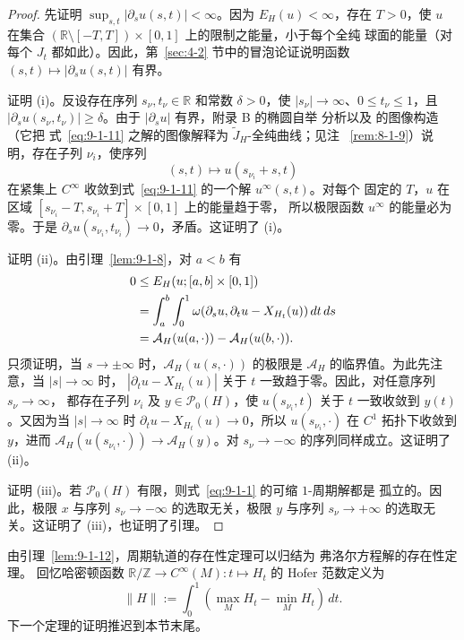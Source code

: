 \begin{proof}
先证明 $\sup_{s,t}|\partial_su(s,t)|<\infty$。因为 $E_H(u)<\infty$，存在 $T>0$，使
$u$ 在集合 $(\mathbb R\setminus[-T,T])\times[0,1]$ 上的限制之能量，小于每个全纯
球面的能量（对每个 $J_t$ 都如此）。因此，第~\ref{sec:4-2} 节中的冒泡论证说明函数
$(s,t)\mapsto|\partial_su(s,t)|$ 有界。

证明 (i)。反设存在序列 $s_\nu,t_\nu\in\mathbb R$ 和常数 $\delta>0$，使
$|s_\nu|\to\infty$、$0\le t_\nu\le1$，且
$|\partial_su(s_\nu,t_\nu)|\ge\delta$。由于 $|\partial_su|$ 有界，附录 B 的椭圆自举
分析以及 的图像构造（它把
式~\eqref{eq:9-1-11} 之解的图像解释为 $\widetilde J_H$-全纯曲线；见注
~\ref{rem:8-1-9}）说明，存在子列 $\nu_i$，使序列
\[
  (s,t)\longmapsto u(s_{\nu_i}+s,t)
\]
在紧集上 $C^\infty$ 收敛到式~\eqref{eq:9-1-11} 的一个解 $u^\infty(s,t)$。对每个
固定的 $T$，$u$ 在区域 $[s_{\nu_i}-T,s_{\nu_i}+T]\times[0,1]$ 上的能量趋于零，
所以极限函数 $u^\infty$ 的能量必为零。于是
$\partial_su(s_{\nu_i},t_{\nu_i})\to0$，矛盾。这证明了 (i)。

证明 (ii)。由引理~\ref{lem:9-1-8}，对 $a<b$ 有
\begin{align}
  0&\le E_H(u;[a,b]\times[0,1])\notag\\
   &=\int_a^b\int_0^1
     \omega(\partial_su,\partial_tu-X_{H_t}(u))\,dt\,ds\label{eq:9-1-12}\\
   &=\mathcal A_H(u(a,\cdot))-\mathcal A_H(u(b,\cdot)).\notag
\end{align}
只须证明，当 $s\to\pm\infty$ 时，$\mathcal A_H(u(s,\cdot))$ 的极限是
$\mathcal A_H$ 的临界值。为此先注意，当 $|s|\to\infty$ 时，
$|\partial_tu-X_{H_t}(u)|$ 关于 $t$ 一致趋于零。因此，对任意序列 $s_\nu\to\infty$，
都存在子列 $\nu_i$ 及 $y\in\mathcal P_0(H)$，使
$u(s_{\nu_i},t)$ 关于 $t$ 一致收敛到 $y(t)$。又因为当 $|s|\to\infty$ 时
$\partial_tu-X_{H_t}(u)\to0$，所以 $u(s_{\nu_i},\cdot)$ 在 $C^1$ 拓扑下收敛到
$y$，进而 $\mathcal A_H(u(s_{\nu_i},\cdot))\to\mathcal A_H(y)$。对
$s_\nu\to-\infty$ 的序列同样成立。这证明了 (ii)。

证明 (iii)。若 $\mathcal P_0(H)$ 有限，则式~\eqref{eq:9-1-1} 的可缩 $1$-周期解都是
孤立的。因此，极限 $x$ 与序列 $s_\nu\to-\infty$ 的选取无关，极限 $y$ 与序列
$s_\nu\to+\infty$ 的选取无关。这证明了 (iii)，也证明了引理。
\end{proof}

由引理~\ref{lem:9-1-12}，周期轨道的存在性定理可以归结为 弗洛尔方程解的存在性定理。
回忆哈密顿函数
$\mathbb R/\mathbb Z\to C^\infty(M):t\mapsto H_t$ 的 Hofer 范数定义为
\[
  \|H\|:=\int_0^1\left(\max_MH_t-\min_MH_t\right)\,dt.
\]
下一个定理的证明推迟到本节末尾。

